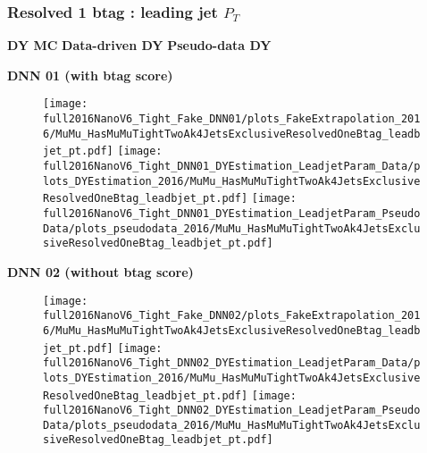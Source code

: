 \documentclass[9pt]{beamer}
\begin{document}
\begin{frame}
	\frametitle{Resolved 1 btag : leading jet $P_T$}
    \hspace{2cm} \textbf{DY MC} \hspace{1.9cm} \textbf{Data-driven DY} \hspace{1cm} \textbf{Pseudo-data DY}
    \begin{center}
        \textbf{DNN 01 (with btag score)}
    \end{center}
	\begin{figure}
		\texttt{[image: full2016NanoV6\_Tight\_Fake\_DNN01/plots\_FakeExtrapolation\_2016/MuMu\_HasMuMuTightTwoAk4JetsExclusiveResolvedOneBtag\_leadbjet\_pt.pdf]}
		\texttt{[image: full2016NanoV6\_Tight\_DNN01\_DYEstimation\_LeadjetParam\_Data/plots\_DYEstimation\_2016/MuMu\_HasMuMuTightTwoAk4JetsExclusiveResolvedOneBtag\_leadbjet\_pt.pdf]}
		\texttt{[image: full2016NanoV6\_Tight\_DNN01\_DYEstimation\_LeadjetParam\_PseudoData/plots\_pseudodata\_2016/MuMu\_HasMuMuTightTwoAk4JetsExclusiveResolvedOneBtag\_leadbjet\_pt.pdf]}
	\end{figure}
    \begin{center}
        \textbf{DNN 02 (without btag score)}
    \end{center}
	\begin{figure}
		\texttt{[image: full2016NanoV6\_Tight\_Fake\_DNN02/plots\_FakeExtrapolation\_2016/MuMu\_HasMuMuTightTwoAk4JetsExclusiveResolvedOneBtag\_leadbjet\_pt.pdf]}
		\texttt{[image: full2016NanoV6\_Tight\_DNN02\_DYEstimation\_LeadjetParam\_Data/plots\_DYEstimation\_2016/MuMu\_HasMuMuTightTwoAk4JetsExclusiveResolvedOneBtag\_leadbjet\_pt.pdf]}
		\texttt{[image: full2016NanoV6\_Tight\_DNN02\_DYEstimation\_LeadjetParam\_PseudoData/plots\_pseudodata\_2016/MuMu\_HasMuMuTightTwoAk4JetsExclusiveResolvedOneBtag\_leadbjet\_pt.pdf]}
	\end{figure}
\end{frame}
\end{document}
